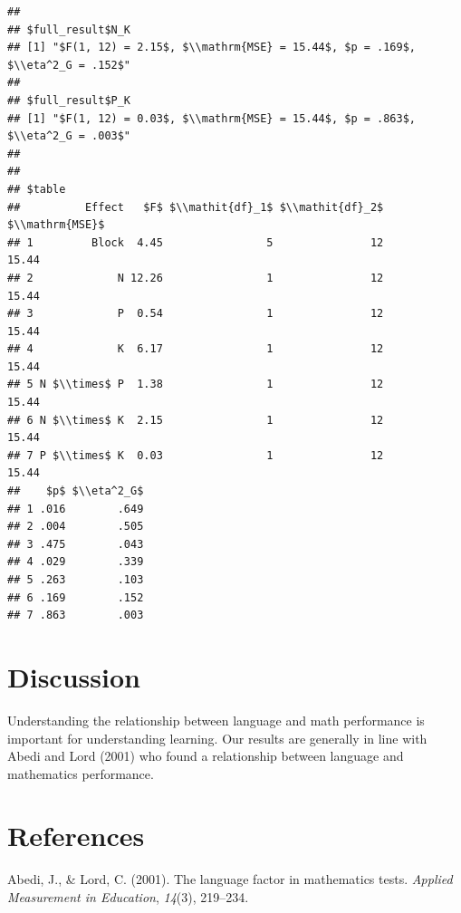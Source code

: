 \documentclass[english,floatsintext,man]{apa6}
\theoremstyle{definition}
\theoremstyle{definition}
\theoremstyle{definition}
\theoremstyle{remark}
\begin{document}
\begin{verbatim}
## 
## $full_result$N_K
## [1] "$F(1, 12) = 2.15$, $\\mathrm{MSE} = 15.44$, $p = .169$, $\\eta^2_G = .152$"
## 
## $full_result$P_K
## [1] "$F(1, 12) = 0.03$, $\\mathrm{MSE} = 15.44$, $p = .863$, $\\eta^2_G = .003$"
## 
## 
## $table
##          Effect   $F$ $\\mathit{df}_1$ $\\mathit{df}_2$ $\\mathrm{MSE}$
## 1         Block  4.45                5               12           15.44
## 2             N 12.26                1               12           15.44
## 3             P  0.54                1               12           15.44
## 4             K  6.17                1               12           15.44
## 5 N $\\times$ P  1.38                1               12           15.44
## 6 N $\\times$ K  2.15                1               12           15.44
## 7 P $\\times$ K  0.03                1               12           15.44
##    $p$ $\\eta^2_G$
## 1 .016        .649
## 2 .004        .505
## 3 .475        .043
## 4 .029        .339
## 5 .263        .103
## 6 .169        .152
## 7 .863        .003
\end{verbatim}

\section{Discussion}\label{discussion}

Understanding the relationship between language and math performance is
important for understanding learning. Our results are generally in line
with Abedi and Lord (2001) who found a relationship between language and
mathematics performance.

\section{References}\label{references}

\setlength{\parindent}{-0.5in} \setlength{\leftskip}{0.5in}
\setlength{\parskip}{8pt}

\hypertarget{refs}{}
\hypertarget{ref-abedi2001language}{}
Abedi, J., \& Lord, C. (2001). The language factor in mathematics tests.
\emph{Applied Measurement in Education}, \emph{14}(3), 219--234.
\end{document}
